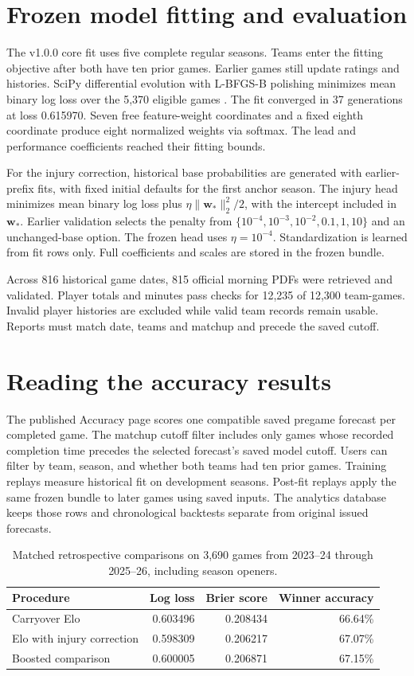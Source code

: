 \documentclass[11pt]{article}
\begin{document}
\section{Frozen model fitting and evaluation}
The v1.0.0 core fit uses five complete regular seasons. Teams enter the
fitting objective after both have ten prior games. Earlier games still
update ratings and histories. SciPy differential evolution with L-BFGS-B
polishing minimizes mean binary log loss over the 5,370 eligible games
\cite{scipy}. The fit converged in 37 generations at loss 0.615970.
Seven free feature-weight coordinates and a fixed eighth coordinate
produce eight normalized weights via softmax. The lead and performance
coefficients reached their fitting bounds.

For the injury correction, historical base probabilities are generated
with earlier-prefix fits, with fixed initial defaults for the first
anchor season. The injury head minimizes mean binary log loss plus
$\eta\|\mathbf w_*\|_2^2/2$, with the intercept included in
$\mathbf w_*$. Earlier validation selects the penalty from
$\{10^{-4},10^{-3},10^{-2},0.1,1,10\}$ and an unchanged-base option.
The frozen head uses $\eta=10^{-4}$. Standardization is learned from
fit rows only. Full coefficients and scales are stored in the frozen bundle.

Across 816 historical game dates, 815 official morning PDFs were retrieved
and validated. Player totals and minutes pass checks for 12,235 of
12,300 team-games. Invalid player histories are excluded while valid team
records remain usable. Reports must match date, teams and matchup and
precede the saved cutoff.

\section{Reading the accuracy results}
The published Accuracy page scores one compatible saved pregame forecast
per completed game. The matchup cutoff filter includes only games whose
recorded completion time precedes the selected forecast's saved model
cutoff. Users can filter by team, season, and whether both teams had ten
prior games. Training replays measure historical fit on development seasons.
Post-fit replays apply the same frozen bundle to later games using saved
inputs. The analytics database keeps those rows and chronological backtests
separate from original issued forecasts.

\begin{table}[ht]
\centering\small
\begin{tabular}{lrrr}
\toprule
Procedure & Log loss & Brier score & Winner accuracy\\
\midrule
Carryover Elo & 0.603496 & 0.208434 & 66.64\%\\
Elo with injury correction & 0.598309 & 0.206217 & 67.07\%\\
Boosted comparison & 0.600005 & 0.206871 & 67.15\%\\
\bottomrule
\end{tabular}
\caption{Matched retrospective comparisons on 3,690 games from
2023--24 through 2025--26, including season openers.}
\end{table}
\end{document}
